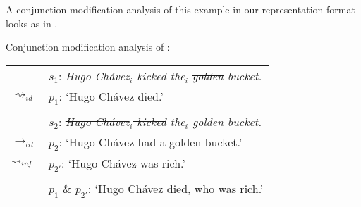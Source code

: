 \documentclass[output=paper]{langsci/langscibook}
\begin{document}
\noindent A conjunction modification analysis of this example in our representation format looks as in .

\ea \label{analysis golden bucket} 
Conjunction modification analysis of : \\
\vspace{5pt}
\begin{tabular}{ll}
								& 	$s_{1}$: \hspace{4pt} \textit{Hugo Ch\'avez$_{i}$ kicked the$_{i}$ \sout{golden} bucket.} \\
$\rightsquigarrow_{id}$				&	$p_{1}$: \hspace{1pt} `Hugo Ch\'avez died.' \\
\vspace{-5pt} \\
								& 	$s_{2}$: \hspace{4pt} \textit{\sout{Hugo Ch\'avez$_{i}$ kicked} the$_{i}$ golden bucket.} \\
$\rightarrow_{lit}$					&	$p_{2}$: \hspace{1pt} `Hugo Ch\'avez had a golden bucket.' \\
$\rightsquigarrow_{in\hspace{-0.8pt} f}$	&	$p_{2'}$: \hspace{-1.5pt} `Hugo Ch\'avez was rich.' \\
\vspace{-5pt} \\
								&	$p_{1}$ \& $p_{2'}$: `Hugo Ch\'avez died, who was rich.'
\end{tabular}
\z
\end{document}
